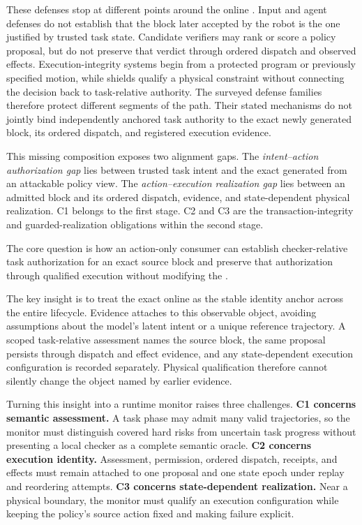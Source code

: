 These defenses stop at different points around the online \actionblock.  Input
and agent defenses do not establish that the block later accepted by the robot
is the one justified by trusted task state.  Candidate verifiers may rank or
score a policy proposal, but do not preserve that verdict through ordered
dispatch and observed effects.  Execution-integrity systems begin from a
protected program or previously specified motion, while shields qualify a
physical constraint without connecting the decision back to task-relative
authority.  The surveyed defense families therefore protect different segments
of the path.  Their stated mechanisms do not jointly bind independently anchored
task authority to the exact newly generated block, its ordered dispatch, and
registered execution evidence.

This missing composition exposes two alignment gaps.  The \emph{intent--action
authorization gap} lies between trusted task intent and the exact \actionblock
generated from an attackable policy view.  The \emph{action--execution
realization gap} lies between an admitted block and its ordered dispatch,
evidence, and state-dependent physical realization.  C1 belongs to the first
stage.  C2 and C3 are the transaction-integrity and guarded-realization
obligations within the second stage.

The core question is how an action-only consumer can establish
checker-relative task authorization for an exact source block and preserve that
authorization through qualified execution without modifying the \vla.

The key insight is to treat the exact online \actionblock as the stable identity
anchor across the entire lifecycle.  Evidence attaches to this observable
object, avoiding assumptions about the model's latent intent or a unique
reference trajectory.  A scoped task-relative assessment names the source
block, the same proposal persists through dispatch and effect evidence, and any
state-dependent execution configuration is recorded separately.  Physical
qualification therefore cannot silently change the object named by earlier
evidence.

Turning this insight into a runtime monitor raises three challenges.  \textbf{C1
concerns semantic assessment.}  A task phase may admit many valid trajectories,
so the monitor must distinguish covered hard risks from uncertain task progress
without presenting a local checker as a complete semantic oracle.  \textbf{C2
concerns execution identity.}  Assessment, permission, ordered dispatch,
receipts, and effects must remain attached to one proposal and one state epoch
under replay and reordering attempts.  \textbf{C3 concerns state-dependent
realization.}  Near a physical boundary, the monitor must qualify an execution
configuration while keeping the policy's source action fixed and making failure
explicit.

